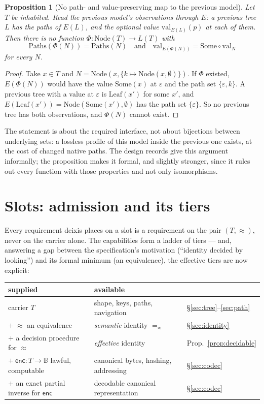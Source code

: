 \documentclass[11pt]{article}
\newtheorem{proposition}[theorem]{Proposition}
\theoremstyle{definition}
\newcommand{\Bytes}{\mathbb{B}}                    %
\newcommand{\NodeT}[1]{\mathrm{Node}(#1)}
\newcommand{\Leaf}{\mathrm{Leaf}}
\newcommand{\eqS}{=_{\approx}}                     %
\newcommand{\enc}{\mathsf{enc}}
\newcommand{\Paths}{\mathrm{Paths}}
\begin{document}
\begin{proposition}[No path- and value-preserving map to the previous model]\label{prop:nonembed}
Let $T$ be inhabited. Read the previous model's observations through $E$: a previous tree
$L$ has the paths of $E(L)$, and the optional value $\mathrm{val}_{E(L)}(p)$ at each of them.
Then there is no function $\Phi : \NodeT{T} \to L(T)$ with
\[
\Paths(\Phi(N)) = \Paths(N) \quad\text{and}\quad
\mathrm{val}_{E(\Phi(N))} = \mathrm{Some} \circ \mathrm{val}_N
\]
for every $N$.
\end{proposition}

\begin{proof}
Take $x \in T$ and $N = \mathrm{Node}(x, \{k \mapsto \mathrm{Node}(x, \emptyset)\})$. If
$\Phi$ existed, $E(\Phi(N))$ would have the value $\mathrm{Some}(x)$ at $\varepsilon$ and the
path set $\{\varepsilon, k\}$. A previous tree with
a value at $\varepsilon$ is $\Leaf(x')$ for some $x'$, and $E(\Leaf(x')) =
\mathrm{Node}(\mathrm{Some}(x'), \emptyset)$ has the path set $\{\varepsilon\}$. So no
previous tree has both observations, and $\Phi(N)$ cannot exist.
\end{proof}

The statement is about the required interface, not about bijections between underlying
sets: a lossless profile of this model inside the previous one exists, at the cost of
changed native paths. The design records give this argument informally; the proposition
makes it formal, and slightly stronger, since it rules out every function
with those properties and not only isomorphisms.

\section{Slots: admission and its tiers}\label{sec:slots}

Every requirement deixis places on a slot is a requirement on the pair $(T, \approx)$,
never on the carrier alone. The capabilities form a ladder of tiers --- and, answering
a gap between the specification's motivation (``identity decided by looking'') and its
formal minimum (an equivalence), the effective tiers are now explicit:

\begin{center}
\begin{tabular}{@{}lll@{}}
\toprule
supplied & available & \\
\midrule
carrier $T$ & shape, keys, paths, navigation & \S\ref{sec:tree}--\ref{sec:path}\\
$+\ \approx$ an equivalence & \emph{semantic} identity $\eqS$ & \S\ref{sec:identity}\\
$+$ a decision procedure for $\approx$ & \emph{effective} identity & Prop.~\ref{prop:decidable}\\
$+\ \enc : T \to \Bytes$ lawful, computable & canonical bytes, hashing, addressing & \S\ref{sec:codec}\\
$+$ an exact partial inverse for $\enc$ & decodable canonical representation & \S\ref{sec:codec}\\
\bottomrule
\end{tabular}
\end{center}
\end{document}
